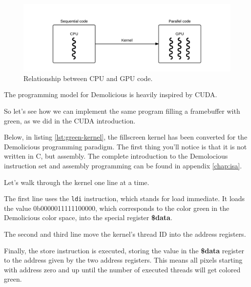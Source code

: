 \documentclass[../main/report.tex]{subfiles}
\begin{document}
\begin{figure}[H]
	\centering
	\includegraphics[width=\textwidth]{../system_overview/diagrams/programming_model_cpu_gpu.png}
	\caption{Relationship between CPU and GPU code.}
	\label{fig:programming_model_cpu_gpu}
\end{figure}

The programming model for Demolicious is heavily inspired by CUDA.

So let's see how we can implement the same program filling a framebuffer with green, as we did in the CUDA introduction.

Below, in listing \ref{lst:green-kernel}, the fillscreen kernel has been converted for the Demolicious programming paradigm.
The first thing you'll notice is that it is not written in C, but assembly.
The complete introduction to the Demolocious instruction set and assembly programming can be found in appendix \ref{chap:isa}.


Let's walk through the kernel one line at a time.

The first line uses the \verb/ldi/ instruction, which stands for load immediate.
It loads the value 0b0000011111100000,
which corresponds to the color green in the Demolicious color space,
into the special register \textbf{\$data}.

The second and third line move the kernel's thread ID into the address registers.

Finally, the store instruction is executed, storing the value in the \textbf{\$data} register
to the address given by the two address registers.
This means all pixels starting with address zero and up until the number of executed threads
will get colored green.
\end{document}
